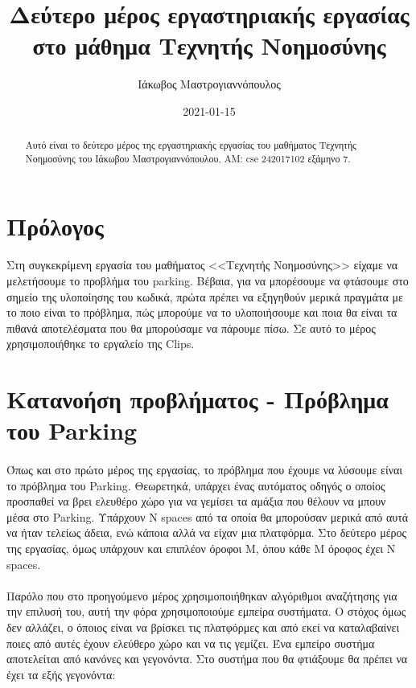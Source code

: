 \documentclass{article}
\title{Δεύτερο μέρος εργαστηριακής εργασίας στο μάθημα Τεχνητής Νοημοσύνης}
\date{2021-01-15}
\author{Ιάκωβος Μαστρογιαννόπουλος}
\begin{document}
    \maketitle

    \newpage
    \tableofcontents
    \newpage
    \lstlistoflistings

    \newpage
    \begin{abstract}
        Αυτό είναι το δεύτερο μέρος της εργαστηριακής εργασίας του μαθήματος Τεχνητής Νοημοσύνης του
        Ιάκωβου Μαστρογιαννόπουλου, AM: cse 242017102 εξάμηνο 7.  
    \end{abstract}

    \newpage
    \section{Πρόλογος}

    \paragraph{}
    Στη συγκεκρίμενη εργασία του μαθήματος <<Τεχνητής Νοημοσύνης>> είχαμε να μελετήσουμε το προβλήμα του parking. Βέβαια,
    για να μπορέσουμε να φτάσουμε στο σημείο της υλοποίησης του κωδικά, πρώτα πρέπει να εξηγηθούν μερικά πραγμάτα με το ποιο είναι
    το πρόβλημα, πώς μπορούμε να το υλοποιήσουμε και ποια θα είναι τα πιθανά αποτελέσματα που θα μπορούσαμε να πάρουμε πίσω.  
    Σε αυτό το μέρος χρησιμοποιήθηκε το εργαλείο της Clips.

    \newpage
    \section{Κατανοήση προβλήματος - Πρόβλημα του Parking}
    \paragraph{}
    Όπως και στο πρώτο μέρος της εργασίας, το πρόβλημα που έχουμε να λύσουμε είναι το πρόβλημα του Parking. Θεωρετηκά, υπάρχει ένας αυτόματος οδηγός ο οποίος προσπαθεί να βρει
    ελευθέρο χώρο για να γεμίσει τα αμάξια που θέλουν να μπουν μέσα στο Parking. Υπάρχουν Ν spaces από τα οποία θα μπορούσαν μερικά από αυτά
    να ήταν τελείως άδεια, ενώ κάποια αλλά να είχαν μια πλατφόρμα. Στο δεύτερο μέρος της εργασίας, όμως υπάρχουν και επιπλέον όροφοι 
    Μ, όπου κάθε Μ όροφος έχει Ν spaces.

    \paragraph{}
    Παρόλο που στο προηγούμενο μέρος χρησιμοποιήθηκαν αλγόριθμοι αναζήτησης για την επιλυσή του, αυτή την φόρα χρησιμοποιούμε εμπείρα συστήματα.
    Ο στόχος όμως δεν αλλάζει, ο όποιος είναι να βρίσκει τις πλατφόρμες και από εκεί να καταλαβαίνει ποιες από αυτές έχουν ελεύθερο χώρο και να τις γεμίζει.
    Ένα εμπείρο συστήμα αποτελείται από κανόνες και γεγονόντα. Στο συστήμα που θα φτιάξουμε θα πρέπει να έχει τα εξής γεγονόντα:
\end{document}
